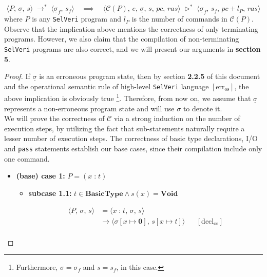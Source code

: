 \documentclass{article}
\begin{document}
\[
\langle P,\, \underline{\sigma},\, s \rangle \; \rightarrow^{\ast} \; \langle \underline{\sigma}_f,\, s_f \rangle \quad \implies \quad 
\langle \mathcal{C}(P),\, e,\, \underline{\sigma},\, s,\, pc,\, ras \rangle \; \triangleright^{\ast} \; \langle \underline{\sigma}_f,\, s_f,\, pc + l_P,\, ras \rangle 
\] where $P$ is any \texttt{SelVeri} program and $l_P$ is the number of commands in $\mathcal{C}(P)$. \\

Observe that the implication above mentions the correctness of only terminating programs. However, we also claim that the compilation of non-terminating \texttt{SelVeri} programs are also correct, and we will present our arguments in \textbf{section 5}.

\begin{proof}
If $\underline{\sigma}$ is an erroneous program state, then by section \textbf{2.2.5} of this document and the operational semantic rule of high-level \texttt{SelVeri} language $[ \text{err}_{\text{os}} ]$, the above implication is obviously true \footnote{Furthermore, $\sigma = \sigma_f$ and $s = s_f$, in this case.}.  Therefore, from now on, we assume that $\underline{\sigma}$ represents a non-erroneous program state and will use $\sigma$ to denote it. \\

We will prove the correctness of $\mathcal{C}$ via a strong induction on the number of execution steps, by utilizing the fact that sub-statements naturally require a lesser number of execution steps. The correctness of basic type declarations, I/O and \texttt{pass} statements establish our base cases, since their compilation include only one command.

\newpage
\begin{itemize}
    \item \textbf{(base) case 1:} $P = (x \;\texttt{:}\; t)$

        \begin{itemize}
            \item \textbf{subcase 1.1:} $t \in \textbf{BasicType} \land s(x) = \textbf{Void}$

            \[
              \begin{aligned}
              \langle P,\, \sigma,\, s \rangle
              &=\langle x \;\texttt{:}\; t,\, \sigma,\, s \rangle \\
              &\rightarrow \langle \sigma[x \mapsto \textbf{0}] ,\, s[x \mapsto t] \rangle
              && [ \text{decl}_{\text{os}} ] \\   
              \end{aligned}
          \]
          

\end{itemize}
\end{itemize}
\end{proof}
\end{document}
